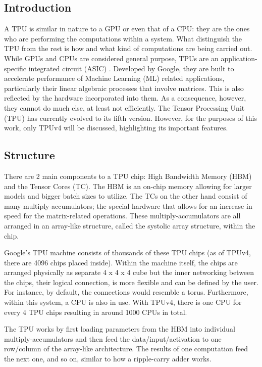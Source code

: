 \subsection{Introduction}
\label{subsec:introduction2}
A TPU is similar in nature to a GPU or even that of a CPU: they are the ones who are performing the computations within a system.
What distinguish the TPU from the rest is how and what kind of computations are being carried out.
While GPUs and CPUs are considered general purpose, TPUs are an application-specific integrated circuit (ASIC) \cite{b6}.
Developed by Google, they are built to accelerate performance of Machine Learning (ML) related applications, particularly their linear algebraic processes that involve matrices.
This is also reflected by the hardware incorporated into them.
As a consequence, however, they cannot do much else, at least not efficiently.
The Tensor Processing Unit (TPU) has currently evolved to its fifth version.
However, for the purposes of this work, only TPUv4 will be discussed, highlighting its important features.

\subsection{Structure}
\label{subsec:structure}
There are 2 main components to a TPU chip: High Bandwidth Memory (HBM) and the Tensor Cores (TC).
The HBM is an on-chip memory allowing for larger models and bigger batch sizes to utilize.
The TCs on the other hand consist of many multiply-accumulators; the special hardware that allows for an increase in speed for the matrix-related operations.
These multiply-accumulators are all arranged in an array-like structure, called the systolic array structure, within the chip.

Google’s TPU machine consists of thousands of these TPU chips (as of TPUv4, there are 4096 chips placed inside).
Within the machine itself, the chips are arranged physically as separate 4 x 4 x 4 cube but the inner networking between the chips, their logical connection, is more flexible and can be defined by the user.
For instance, by default, the connections would resemble a torus.
Furthermore, within this system, a CPU is also in use.
With TPUv4, there is one CPU for every 4 TPU chips resulting in around 1000 CPUs in total.

The TPU works by first loading parameters from the HBM into individual multiply-accumulators and then feed the data/input/activation to one row/column of the array-like architecture.
The results of one computation feed the next one, and so on, similar to how a ripple-carry adder works.

